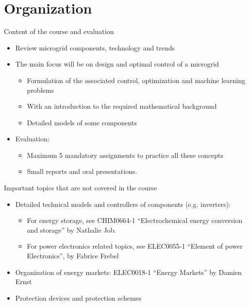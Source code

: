 \section{Organization}
\begin{frame}{Content of the course and evaluation}
\begin{itemize}
  \item Review microgrid components, technology and trends
  \item The main focus will be on design and optimal control of a microgrid
  \begin{itemize}
    \item Formulation of the associated control, optimization and machine learning problems
    \item With an introduction to the required mathematical background
    \item Detailed models of some components  
  \end{itemize}
  \item Evaluation:
  \begin{itemize}
    \item Maximum 5 mandatory assignments to practice all these concepts
    \item Small reports and oral presentations.
  \end{itemize}
\end{itemize}
\end{frame}

\begin{frame}{Important topics that are not covered in the course}
\begin{itemize}
  \item Detailed technical models and controllers of components (e.g. inverters):
  \begin{itemize}
    \item For energy storage, see CHIM0664-1 “Electrochemical energy conversion and storage” by Nathalie Job.
    \item For power electronics related topics, see ELEC0055-1 “Element of power Electronics”, by Fabrice Frebel
  \end{itemize}
  \item Organization of energy markets: ELEC0018-1 “Energy Markets” by Damien Ernst
  \item Protection devices and protection schemes
\end{itemize}
\end{frame}
